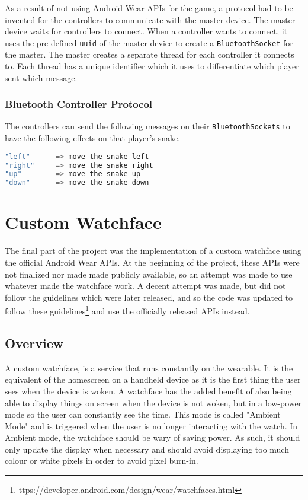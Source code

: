 As a result of not using Android Wear APIs for the game, a protocol had to be
invented for the controllers to communicate with the master device. The master
device waits for controllers to connect. When a controller wants to connect, it
uses the pre-defined \texttt{uuid} of the master device to create a
\texttt{BluetoothSocket} for the master. The master creates a separate thread
for each controller it connects to. Each thread has a unique identifier which
it uses to differentiate which player sent which message.

\subsubsection{Bluetooth Controller Protocol}

The controllers can send the following messages on their
\texttt{BluetoothSockets} to have the following effects on that player's snake.

\begin{lstlisting}[language=Java]
"left"      => move the snake left
"right"     => move the snake right
"up"        => move the snake up
"down"      => move the snake down

\end{lstlisting}




\section{Custom Watchface}

The final part of the project was the implementation of a custom watchface using
the official Android Wear APIs. At the beginning of the project, these APIs were
not finalized nor made made publicly available, so an attempt was made to use
whatever made the watchface work. A decent attempt was made, but did not follow
the guidelines which were later released, and so the code was updated to follow
these
guidelines\footnote{ttps://developer.android.com/design/wear/watchfaces.html}
and use the officially released APIs instead.

\subsection{Overview}

A custom watchface, is a service that runs constantly on the wearable. It is the
equivalent of the homescreen on a handheld device as it is the first thing the
user sees when the device is woken. A watchface has the added benefit of also
being able to display things on screen when the device is not woken, but in a
low-power mode so the user can constantly see the time. This mode is called
"Ambient Mode" and is triggered when the user is no longer interacting with the
watch. In Ambient mode, the watchface should be wary of saving power. As such,
it should only update the display when necessary and should avoid displaying
too much colour or white pixels in order to avoid pixel burn-in.

